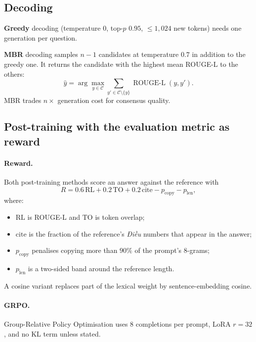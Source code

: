 \documentclass[11pt,a4paper]{article}
\newcommand{\rl}{ROUGE-L}
\newcommand{\dieu}{\textit{Điều}}
\begin{document}
\subsection{Decoding}
\textbf{Greedy} decoding (temperature $0$, top-$p$ $0.95$, $\le 1{,}024$ new tokens) needs one generation per question.

\textbf{MBR} decoding \cite{mbr} samples $n{-}1$ candidates at temperature $0.7$ in addition to the greedy one. It returns the candidate with the highest mean \rl{} to the others:
\begin{equation}
\hat y=\arg\max_{y\in\mathcal C}\sum_{y'\in\mathcal C\setminus\{y\}}\operatorname{ROUGE\text{-}L}(y,y').
\end{equation}
MBR trades $n\times$ generation cost for consensus quality.

\subsection{Post-training with the evaluation metric as reward}
\paragraph{Reward.} Both post-training methods score an answer against the reference with
\begin{equation}
R=0.6\,\mathrm{RL}+0.2\,\mathrm{TO}+0.2\,\mathrm{cite}-p_{\mathrm{copy}}-p_{\mathrm{len}},
\end{equation}
where:
\begin{itemize}[leftmargin=*]
\item $\mathrm{RL}$ is \rl{} and $\mathrm{TO}$ is token overlap;
\item $\mathrm{cite}$ is the fraction of the reference's \dieu{} numbers that appear in the answer;
\item $p_{\mathrm{copy}}$ penalises copying more than $90\%$ of the prompt's 8-grams;
\item $p_{\mathrm{len}}$ is a two-sided band around the reference length.
\end{itemize}
A cosine variant replaces part of the lexical weight by sentence-embedding cosine.

\paragraph{GRPO.} Group-Relative Policy Optimisation \cite{grpo} uses $8$ completions per prompt, LoRA $r{=}32$, and no KL term unless stated.
\end{document}
